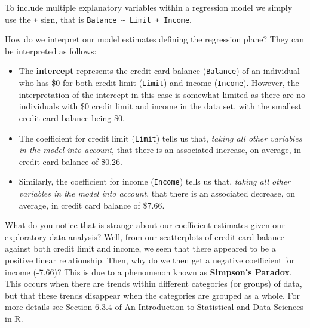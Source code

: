 \documentclass[
  letterpaper,
  DIV=11,
  numbers=noendperiod]{scrartcl}
\providecommand{\tightlist}{%
  \setlength{\itemsep}{0pt}\setlength{\parskip}{0pt}}\usepackage{longtable,booktabs,array}
\begin{document}
\begin{tcolorbox}[enhanced jigsaw, opacityback=0, arc=.35mm, coltitle=black, toprule=.15mm, colback=white, opacitybacktitle=0.6, left=2mm, breakable, rightrule=.15mm, colbacktitle=quarto-callout-note-color!10!white, bottomrule=.15mm, bottomtitle=1mm, toptitle=1mm, titlerule=0mm, title=\textcolor{quarto-callout-note-color}{\faInfo}\hspace{0.5em}{Note}, leftrule=.75mm, colframe=quarto-callout-note-color-frame]

To include multiple explanatory variables within a regression model we
simply use the \texttt{+} sign, that is
\texttt{Balance\ \textasciitilde{}\ Limit\ +\ Income}.

\end{tcolorbox}

How do we interpret our model estimates defining the regression plane?
They can be interpreted as follows:

\begin{itemize}
\tightlist
\item
  The \textbf{intercept} represents the credit card balance
  (\texttt{Balance}) of an individual who has \$0 for both credit limit
  (\texttt{Limit}) and income (\texttt{Income}). However, the
  interpretation of the intercept in this case is somewhat limited as
  there are no individuals with \$0 credit limit and income in the data
  set, with the smallest credit card balance being \$0.
\item
  The coefficient for credit limit (\texttt{Limit}) tells us that,
  \emph{taking all other variables in the model into account}, that
  there is an associated increase, on average, in credit card balance of
  \$0.26.
\item
  Similarly, the coefficient for income (\texttt{Income}) tells us that,
  \emph{taking all other variables in the model into account}, that
  there is an associated decrease, on average, in credit card balance of
  \$7.66.
\end{itemize}

What do you notice that is strange about our coefficient estimates given
our exploratory data analysis? Well, from our scatterplots of credit
card balance against both credit limit and income, we seen that there
appeared to be a positive linear relationship. Then, why do we then get
a negative coefficient for income (-7.66)? This is due to a phenomenon
known as \textbf{Simpson's Paradox}. This occurs when there are trends
within different categories (or groups) of data, but that these trends
disappear when the categories are grouped as a whole. For more details
see
\href{https://moderndive.com/6-multiple-regression.html\#simpsonsparadox}{Section
6.3.4 of An Introduction to Statistical and Data Sciences in R}.
\end{document}
